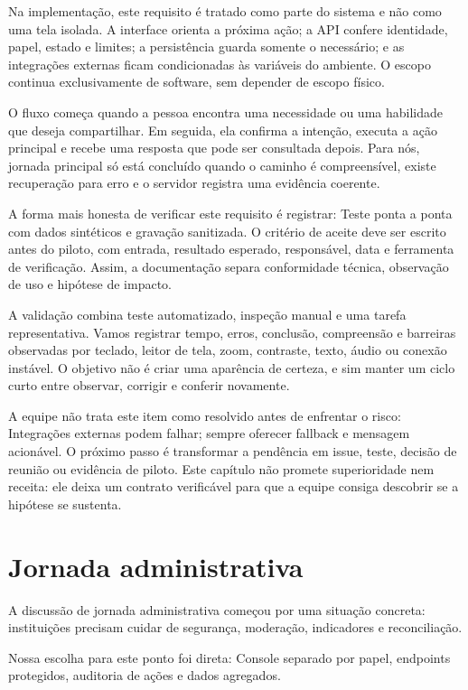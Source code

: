 \documentclass[12pt,oneside,a4paper,article]{abntex2}
\begin{document}
Na implementação, este requisito é tratado como parte do sistema e não como uma tela isolada. A interface orienta a próxima ação; a API confere identidade, papel, estado e limites; a persistência guarda somente o necessário; e as integrações externas ficam condicionadas às variáveis do ambiente. O escopo continua exclusivamente de software, sem depender de escopo físico.

O fluxo começa quando a pessoa encontra uma necessidade ou uma habilidade que deseja compartilhar. Em seguida, ela confirma a intenção, executa a ação principal e recebe uma resposta que pode ser consultada depois. Para nós, jornada principal só está concluído quando o caminho é compreensível, existe recuperação para erro e o servidor registra uma evidência coerente.

A forma mais honesta de verificar este requisito é registrar: Teste ponta a ponta com dados sintéticos e gravação sanitizada. O critério de aceite deve ser escrito antes do piloto, com entrada, resultado esperado, responsável, data e ferramenta de verificação. Assim, a documentação separa conformidade técnica, observação de uso e hipótese de impacto.

A validação combina teste automatizado, inspeção manual e uma tarefa representativa. Vamos registrar tempo, erros, conclusão, compreensão e barreiras observadas por teclado, leitor de tela, zoom, contraste, texto, áudio ou conexão instável. O objetivo não é criar uma aparência de certeza, e sim manter um ciclo curto entre observar, corrigir e conferir novamente.

A equipe não trata este item como resolvido antes de enfrentar o risco: Integrações externas podem falhar; sempre oferecer fallback e mensagem acionável. O próximo passo é transformar a pendência em issue, teste, decisão de reunião ou evidência de piloto. Este capítulo não promete superioridade nem receita: ele deixa um contrato verificável para que a equipe consiga descobrir se a hipótese se sustenta.

\section{Jornada administrativa}
A discussão de jornada administrativa começou por uma situação concreta: instituições precisam cuidar de segurança, moderação, indicadores e reconciliação.

Nossa escolha para este ponto foi direta: Console separado por papel, endpoints protegidos, auditoria de ações e dados agregados.
\end{document}
